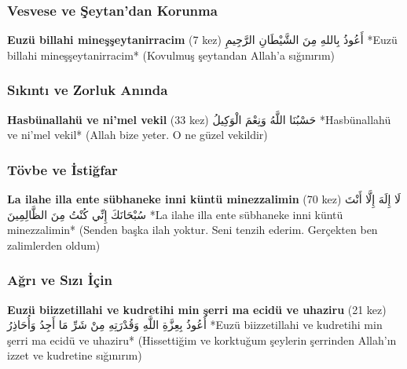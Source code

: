 \documentclass[12pt,a4paper]{article}
\begin{document}
\subsubsection{Vesvese ve Şeytan'dan Korunma}
\textbf{Euzü billahi mineşşeytanirracim} (7 kez)
أَعُوذُ بِاللهِ مِنَ الشَّيْطَانِ الرَّجِيمِ
*Euzü billahi mineşşeytanirracim*
(Kovulmuş şeytandan Allah'a sığınırım)
\subsubsection{Sıkıntı ve Zorluk Anında}
\textbf{Hasbünallahü ve ni'mel vekil} (33 kez)
حَسْبُنَا اللَّهُ وَنِعْمَ الْوَكِيلُ
*Hasbünallahü ve ni'mel vekil*
(Allah bize yeter. O ne güzel vekildir)
\subsubsection{Tövbe ve İstiğfar}
\textbf{La ilahe illa ente sübhaneke inni küntü minezzalimin} (70 kez)
لَا إِلَهَ إِلَّا أَنْتَ سُبْحَانَكَ إِنِّي كُنْتُ مِنَ الظَّالِمِينَ
*La ilahe illa ente sübhaneke inni küntü minezzalimin*
(Senden başka ilah yoktur. Seni tenzih ederim. Gerçekten ben zalimlerden oldum)
\subsubsection{Ağrı ve Sızı İçin}
\textbf{Euzü biizzetillahi ve kudretihi min şerri ma ecidü ve uhaziru} (21 kez)
أَعُوذُ بِعِزَّةِ اللَّهِ وَقُدْرَتِهِ مِنْ شَرِّ مَا أَجِدُ وَأُحَاذِرُ
*Euzü biizzetillahi ve kudretihi min şerri ma ecidü ve uhaziru*
(Hissettiğim ve korktuğum şeylerin şerrinden Allah'ın izzet ve kudretine sığınırım)
\end{document}
